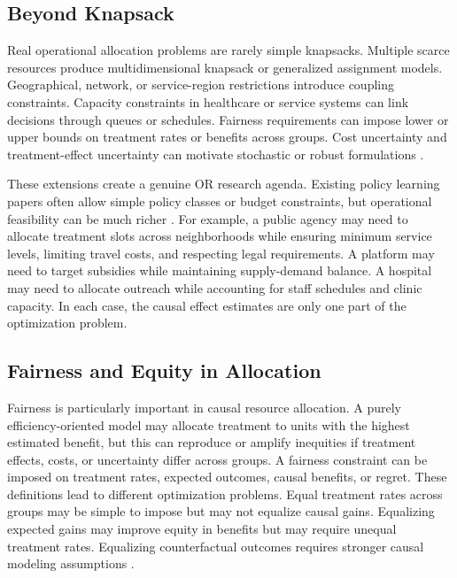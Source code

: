 \documentclass[11pt]{article}
\begin{document}
\subsection{Beyond Knapsack}

Real operational allocation problems are rarely simple knapsacks. Multiple scarce resources produce multidimensional knapsack or generalized assignment models. Geographical, network, or service-region restrictions introduce coupling constraints. Capacity constraints in healthcare or service systems can link decisions through queues or schedules. Fairness requirements can impose lower or upper bounds on treatment rates or benefits across groups. Cost uncertainty and treatment-effect uncertainty can motivate stochastic or robust formulations \citep{bertsimas1997introduction,ben2009robust,bertsimas2011theory}.

These extensions create a genuine OR research agenda. Existing policy learning papers often allow simple policy classes or budget constraints, but operational feasibility can be much richer \citep{kitagawa2018treated,athey2021policy}. For example, a public agency may need to allocate treatment slots across neighborhoods while ensuring minimum service levels, limiting travel costs, and respecting legal requirements. A platform may need to target subsidies while maintaining supply-demand balance. A hospital may need to allocate outreach while accounting for staff schedules and clinic capacity. In each case, the causal effect estimates are only one part of the optimization problem.

\subsection{Fairness and Equity in Allocation}

Fairness is particularly important in causal resource allocation. A purely efficiency-oriented model may allocate treatment to units with the highest estimated benefit, but this can reproduce or amplify inequities if treatment effects, costs, or uncertainty differ across groups. A fairness constraint can be imposed on treatment rates, expected outcomes, causal benefits, or regret. These definitions lead to different optimization problems. Equal treatment rates across groups may be simple to impose but may not equalize causal gains. Equalizing expected gains may improve equity in benefits but may require unequal treatment rates. Equalizing counterfactual outcomes requires stronger causal modeling assumptions \citep{athey2021policy,hernan2020causal}.
\end{document}
